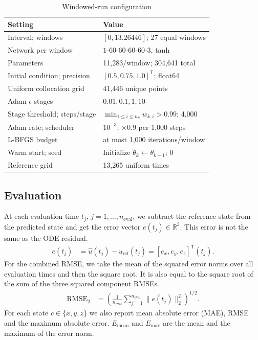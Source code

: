 \documentclass[conference,a4paper]{IEEEtran}
\begin{document}
\begin{table}[t]
\caption{Windowed-run configuration}
\label{tab:config}
\centering\footnotesize
\begin{tabular}{ll}
\toprule
Setting & Value\\
\midrule
Interval; windows & $[0,13.26446]$; 27 equal windows\\
Network per window & $1$-$60$-$60$-$60$-$60$-$3$, tanh\\
Parameters & 11,283/window; 304,641 total\\
Initial condition; precision & $[0.5,0.75,1.0]^\mathsf{T}$; float64\\
Uniform collocation grid & 41,446 unique points\\
Adam $\epsilon$ stages & $0.01,0.1,1,10$\\
Stage threshold; steps/stage & $\min_{1\leq i\leq n_k}w_{k,i}>0.99$; 4,000\\
Adam rate; scheduler & $10^{-3}$; $\times0.9$ per 1,000 steps\\
L-BFGS budget & at most 1,000 iterations/window\\
Warm start; seed & Initialize $\theta_k\gets\theta_{k-1}$; 0\\
Reference grid & 13,265 uniform times\\
\bottomrule
\end{tabular}
\end{table}

\subsection{Evaluation}
At each evaluation time $t_j$, $j=1,\ldots,n_{\mathrm{eval}}$, we subtract the reference state from the predicted state and get the error vector $e(t_j)\in\mathbb{R}^3$. This error is not the same as the ODE residual.
\[
\begin{aligned}
e(t_j)&=\hat{u}(t_j)-u_{\mathrm{ref}}(t_j)=[e_x,e_y,e_z]^\mathsf{T}(t_j).
\end{aligned}
\]
For the combined RMSE, we take the mean of the squared error norms over all evaluation times and then the square root. It is also equal to the square root of the sum of the three squared component RMSEs.
\begin{equation}
\begin{aligned}
\operatorname{RMSE}_2
  &=\left(
      \frac{1}{n_{\mathrm{eval}}}
      \sum_{j=1}^{n_{\mathrm{eval}}}
      \|e(t_j)\|_2^2
     \right)^{1/2}.
\end{aligned}
\label{eq:rmse}
\end{equation}
For each state $c\in\{x,y,z\}$ we also report mean absolute error (MAE), RMSE and the maximum absolute error. $E_{\mathrm{mean}}$ and $E_{\mathrm{max}}$ are the mean and the maximum of the error norm.
\end{document}

